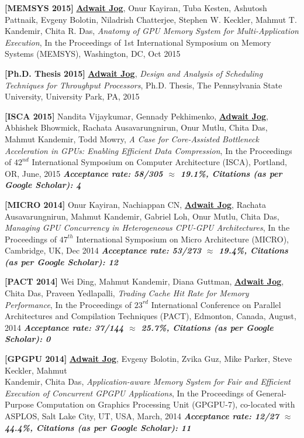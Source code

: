 \documentclass[10pt,a4]{article}
\begin{document}
\begin{description}
\item 
{\bf [MEMSYS 2015]}
{\bf \underline{Adwait Jog}}, Onur Kayiran, Tuba Kesten, Ashutosh Pattnaik, Evgeny Bolotin, Niladrish Chatterjee, 
Stephen W. Keckler, Mahmut T. Kandemir, Chita R. Das, 
{\it Anatomy of GPU Memory System for Multi-Application Execution}, 
In the Proceedings of 1st International Symposium on Memory Systems (MEMSYS), Washington, DC, Oct 2015 

\item 
{\bf [Ph.D. Thesis 2015]}
{\bf \underline{Adwait Jog}}, {\it Design and Analysis of Scheduling Techniques for Throughput Processors}, 
Ph.D. Thesis, The Pennsylvania State University, University Park, PA, 2015

\item 
{\bf [ISCA 2015]}
Nandita Vijaykumar, Gennady Pekhimenko, {\bf \underline{Adwait Jog}}, Abhishek Bhowmick, Rachata Ausavarungnirun, Onur Mutlu, Chita Das, Mahmut Kandemir, Todd Mowry,
{\it A Case for Core-Assisted Bottleneck Acceleration in GPUs: Enabling Efficient Data Compression},
In the Proceedings of $42^{nd}$ International Symposium on Computer Architecture (ISCA), Portland, OR, June, 2015
\textbf{\textit{Acceptance rate: 58/305 $\approx$ 19.1\%, Citations (as per Google Scholar): 4}}

\item{\bf [MICRO 2014]} 
Onur Kayiran, Nachiappan CN, {\bf \underline{Adwait Jog}}, Rachata Ausavarungnirun, 
Mahmut Kandemir, Gabriel Loh, Onur Mutlu, Chita Das, 
{\it Managing GPU Concurrency in Heterogeneous CPU-GPU Architectures}, 
In the Proceedings of $47^{th}$ International Symposium on Micro Architecture (MICRO), Cambridge, UK, Dec 2014
\textbf{\textit{Acceptance rate: 53/273 $\approx$ 19.4\%, Citations (as per Google Scholar): 12}}

\item{\bf [PACT 2014]}
Wei Ding, Mahmut Kandemir, Diana Guttman, {\bf \underline{Adwait Jog}}, Chita Das, Praveen Yedlapalli, 
{\it Trading Cache Hit Rate for Memory Performance}, 
In the Proceedings of $23^{rd}$ International Conference on Parallel Architectures and Compilation Techniques (PACT), 
Edmonton, Canada, August, 2014 
\textbf{\textit{Acceptance rate: 37/144 $\approx$ 25.7\%, Citations (as per Google Scholar): 0}}

\item{\bf [GPGPU 2014]}
{\bf \underline{Adwait Jog}}, Evgeny Bolotin, Zvika Guz, Mike Parker, Steve Keckler, Mahmut \\ Kandemir, Chita Das, 
{\it Application-aware Memory System for Fair and Efficient Execution of Concurrent GPGPU Applications}, 
In the Proceedings of General-Purpose Computation on Graphics Processing Unit (GPGPU-7), co-located with ASPLOS, Salt Lake City, UT, USA, March, 2014
\textbf{\textit{Acceptance rate: 12/27 $\approx$ 44.4\%, Citations (as per Google Scholar): 11}}


\end{description}
\end{document}
